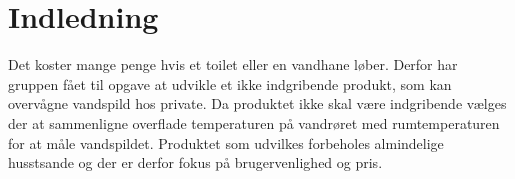 \section{Indledning}
Det koster mange penge hvis et toilet eller en vandhane løber. Derfor har gruppen fået til opgave at udvikle et ikke indgribende produkt, som kan overvågne vandspild hos private. Da produktet ikke skal være indgribende vælges der at sammenligne overflade temperaturen på vandrøret med rumtemperaturen for at måle vandspildet. Produktet som udvilkes forbeholes almindelige husstsande og der er derfor fokus på brugervenlighed og pris.

